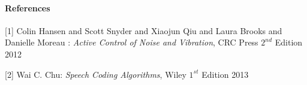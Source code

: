 \documentclass[a4paper]{article}
\begin{document}
	
	\paragraph{References}
	\begin{description}
		\item{[1]}		Colin Hansen and Scott Snyder and Xiaojun Qiu and Laura Brooks and Danielle Moreau  : \emph{Active Control of Noise and Vibration}, CRC Press $2^{nd}$ Edition 2012
		\item{[2]}		Wai C. Chu: \emph{Speech Coding Algorithms}, Wiley $1^{st}$ Edition 2013
	\end{description}
\end{document}
